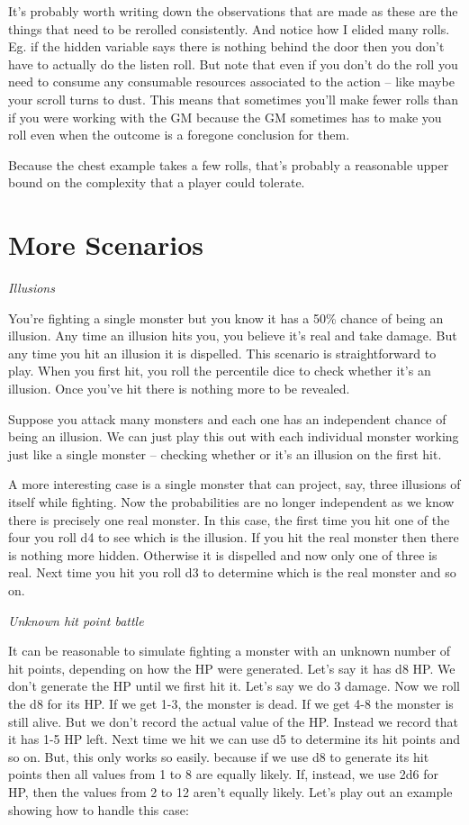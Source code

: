 \documentclass[12pt]{article}
\begin{document}
It's probably worth writing down the observations that are made as
these are the things that need to be rerolled consistently.
And notice
how I elided many rolls. Eg. if the hidden variable says there is
nothing behind the door then you don't have to actually do the
listen roll. But note that even if you don't do the roll you need to
consume any consumable resources associated to the action -- like maybe
your scroll turns to dust. This means that sometimes you'll make
fewer rolls than if you were working with the GM because the GM
sometimes has to make you roll even when the outcome is a foregone
conclusion for them.

Because the chest example takes a few rolls, that's probably a
reasonable upper bound on the complexity that a player could tolerate.

\hypertarget{more-scenarios}{%
\section{More Scenarios}\label{more-scenarios}}

\emph{Illusions}

You're fighting a single monster but you know it has a 50\% chance
of being an illusion. Any time an illusion hits you, you believe
it's real and take damage. But any time you hit an illusion it is
dispelled. This scenario is straightforward to play. When you first hit,
you roll the percentile dice to check whether it's an illusion.
Once you've hit there is nothing more to be revealed.

Suppose you attack many monsters and each one has an independent chance
of being an illusion. We can just play this out with each individual
monster working just like a single monster -- checking whether or
it's an illusion on the first hit.

A more interesting case is a single monster that can project, say, three
illusions of itself while fighting. Now the probabilities are no longer
independent as we know there is precisely one real monster. In this
case, the first time you hit one of the four you roll d4 to see which is
the illusion. If you hit the real monster then there is nothing more
hidden. Otherwise it is dispelled and now only one of three is real.
Next time you hit you roll d3 to determine which is the real monster and
so on.

\emph{Unknown hit point battle}

It can be reasonable to simulate fighting a monster with an unknown
number of hit points, depending on how the HP were generated. Let's say
it has d8 HP. We don't generate the HP until we first hit it. Let's say
we do 3 damage. Now we roll the d8 for its HP. If we get 1-3, the
monster is dead. If we get 4-8 the monster is still alive. But we don't
record the actual value of the HP. Instead we record that it has 1-5 HP
left. Next time we hit we can use d5 to determine its hit points and so
on. But, this only works so easily. because if we use d8 to generate its
hit points then all values from 1 to 8 are equally likely. If, instead,
we use 2d6 for HP, then the values from 2 to 12 aren't equally likely.
Let's play out an example showing how to handle this case:
\end{document}
